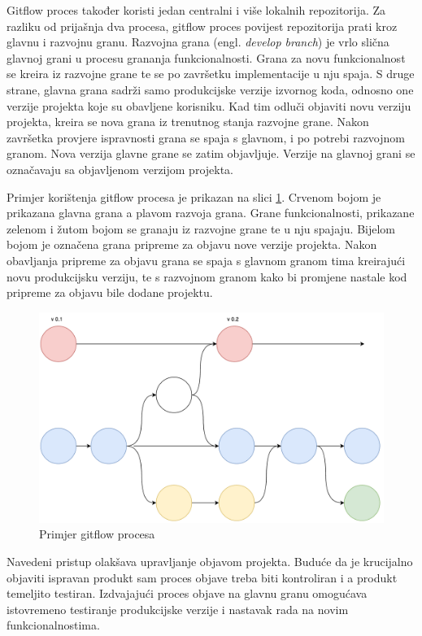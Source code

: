 \documentclass[times, utf8, diplomski, numeric]{fer}
\newcommand{\eng}[1]{(engl. \textit{#1})}
\begin{document}
Gitflow proces također koristi jedan centralni i više lokalnih repozitorija. Za razliku od prijašnja dva procesa, gitflow proces povijest repozitorija prati kroz glavnu i razvojnu granu. Razvojna grana \eng{develop branch} je vrlo slična glavnoj grani u procesu grananja funkcionalnosti. Grana za novu funkcionalnost se kreira iz razvojne grane te se po završetku implementacije u nju spaja. S druge strane, glavna grana sadrži samo produkcijske verzije izvornog koda, odnosno one verzije projekta koje su obavljene korisniku. Kad tim odluči objaviti novu verziju projekta, kreira se nova grana iz trenutnog stanja razvojne grane. Nakon završetka provjere ispravnosti grana se spaja s glavnom, i po potrebi razvojnom granom. Nova verzija glavne grane se zatim objavljuje. Verzije na glavnoj grani se označavaju sa objavljenom verzijom projekta.

Primjer korištenja gitflow procesa je prikazan na slici \ref{fig:Gitflow}. Crvenom bojom je prikazana glavna grana a plavom razvoja grana. Grane funkcionalnosti, prikazane zelenom i žutom bojom se granaju iz razvojne grane te u nju spajaju. Bijelom bojom je označena grana pripreme za objavu nove verzije projekta. Nakon obavljanja pripreme za objavu grana se spaja s glavnom granom tima kreirajući novu produkcijsku verziju, te s razvojnom granom kako bi promjene nastale kod pripreme za objavu bile dodane projektu.

\begin{figure}
\centering
\includegraphics[scale=0.5]{Gitflow}
\caption{Primjer gitflow procesa}
\label{fig:Gitflow}
\end{figure}

Navedeni pristup olakšava upravljanje objavom projekta. Buduće da je krucijalno objaviti ispravan produkt sam proces objave treba biti kontroliran i a produkt temeljito testiran. Izdvajajući proces objave na glavnu granu omogućava istovremeno testiranje produkcijske verzije i nastavak rada na novim funkcionalnostima.
\end{document}
